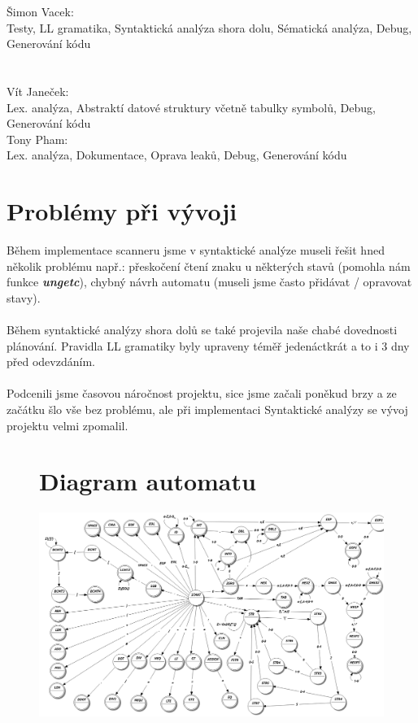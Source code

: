 \documentclass[12pt, letterpaper]{article}
\begin{document}
	Šimon Vacek:\\
	Testy, LL gramatika, Syntaktická analýza shora dolu, Sématická analýza, Debug, Generování kódu\\
	\\\\
	Vít Janeček:\\
	Lex. analýza, Abstraktí datové struktury včetně tabulky symbolů, Debug, Generování kódu\\
	
	Tony Pham:\\
	Lex. analýza, Dokumentace, Oprava leaků, Debug, Generování kódu\\
	
	\section{Problémy při vývoji}
	\large
    Během implementace scanneru jsme v syntaktické analýze museli řešit hned několik problému např.: přeskočení čtení znaku u některých stavů (pomohla nám funkce \textbf{\textit{ungetc}}), chybný návrh automatu (museli jsme často přidávat / opravovat stavy).
	\\
	\\
	Během syntaktické analýzy shora dolů se také projevila naše chabé dovednosti plánování. Pravidla LL gramatiky byly upraveny téměř jedenáctkrát a to i 3 dny před odevzdáním.
	\\
	\\
	Podcenili jsme časovou náročnost projektu, sice jsme začali poněkud brzy a ze začátku šlo vše bez problému, ale při implementaci Syntaktické analýzy se vývoj projektu velmi zpomalil.
	\begin{figure}
        \section{Diagram automatu}
	        \includegraphics[width=\textwidth,height=\textheight,keepaspectratio]{LexAnalyzatorFSM.png}
    \end{figure}
    \newpage
    
\end{document}
